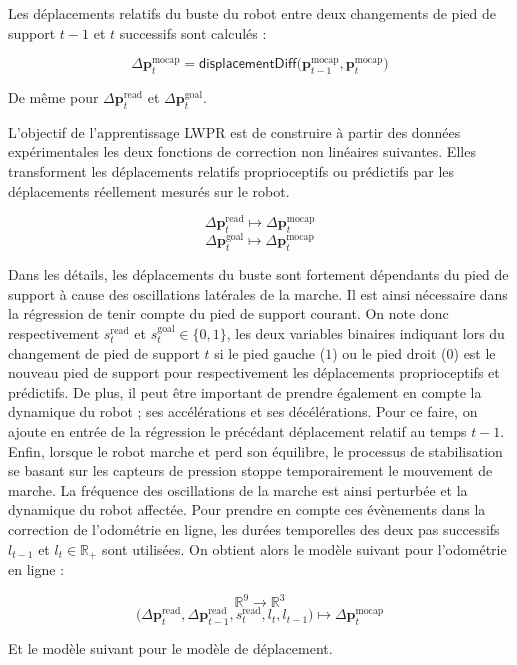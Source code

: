 Les déplacements relatifs du buste du robot entre deux changements
de pied de support $t-1$ et $t$ successifs sont calculés :

$$
\Delta \bm{p}_{t}^{\text{mocap}} = 
\mathsf{displacementDiff}\big(\bm{p}_{t-1}^{\text{mocap}}, \bm{p}_{t}^{\text{mocap}}\big)
$$

De même pour $\Delta \bm{p}_{t}^{\text{read}}$ et $\Delta \bm{p}_{t}^{\text{goal}}$.

L'objectif de l'apprentissage LWPR est de construire à partir des données expérimentales 
les deux fonctions de correction non linéaires suivantes.
Elles transforment les déplacements relatifs proprioceptifs ou prédictifs
par les déplacements réellement mesurés sur le robot.

$$
\Delta \bm{p}_{t}^{\text{read}} \longmapsto \Delta \bm{p}_{t}^{\text{mocap}}
$$
$$
\Delta \bm{p}_{t}^{\text{goal}} \longmapsto \Delta \bm{p}_{t}^{\text{mocap}}
$$

Dans les détails, les déplacements du buste sont fortement dépendants du pied 
de support à cause des oscillations latérales de la marche. 
Il est ainsi nécessaire dans la régression de tenir compte du pied de support courant.
On note donc respectivement $s_{t}^{\text{read}}$ et $s_{t}^{\text{goal}} \in \{0, 1\}$,
les deux variables binaires indiquant lors du changement de pied de support $t$ si le
pied gauche ($1$) ou le pied droit ($0$) est le nouveau pied de support pour respectivement
les déplacements proprioceptifs et prédictifs.
De plus, il peut être important de prendre également en compte la dynamique du robot ; 
ses accélérations et ses décélérations.
Pour ce faire, on ajoute en entrée de la régression le précédant déplacement 
relatif au temps $t-1$.
Enfin, lorsque le robot marche et perd son équilibre, le processus de stabilisation
se basant sur les capteurs de pression stoppe temporairement le mouvement de marche.
La fréquence des oscillations de la marche est ainsi perturbée et la dynamique du robot affectée.
Pour prendre en compte ces évènements dans la correction de l'odométrie en ligne, 
les durées temporelles des deux pas successifs $l_{t-1}$ et $l_{t} \in \mathbb{R}_{+}$ sont utilisées.
On obtient alors le modèle suivant pour l'odométrie en ligne :

$$
\mathbb{R}^9 \longrightarrow \mathbb{R}^3
$$
$$
\big(\Delta \bm{p}_{t}^{\text{read}}, \Delta \bm{p}_{t-1}^{\text{read}}, s_{t}^{\text{read}}, l_{t}, l_{t-1}\big) 
\longmapsto \Delta \bm{p}_{t}^{\text{mocap}}
$$

Et le modèle suivant pour le modèle de déplacement.

